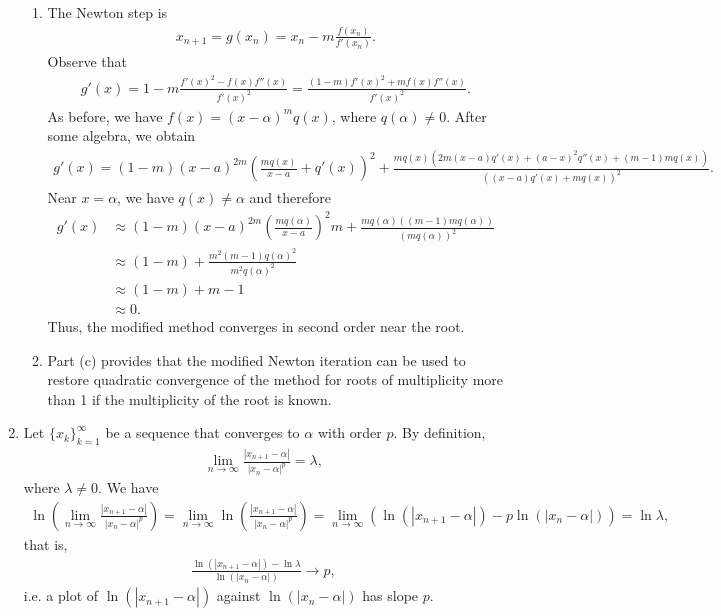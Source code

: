 \documentclass[10pt]{article}
\begin{document}
\begin{enumerate}
\begin{enumerate}
    \item The Newton step is \begin{align*}
        x_{n+1} = g(x_n) = x_n - m \frac{f(x_n)}{f'(x_n)}.
    \end{align*} Observe that \begin{align*}
        g'(x) = 1 - m\frac{f'(x)^2 - f(x)f''(x)}{f'(x)^2} = \frac{(1-m)f'(x)^2 + mf(x)f''(x)}{f'(x)^2}.
    \end{align*} As before, we have \(f(x) = (x-\alpha )^mq(x)\), where \(q(\alpha) \neq 0\). After some algebra, we obtain \begin{align*}
      g'(x) = (1-m) (x-a)^{2 m} \left(\frac{m q(x)}{x-a}+q'(x)\right)^2+\frac{m
      q(x) \left(2 m (x-a) q'(x)+(a-x)^2 q''(x)+(m-1) m
      q(x)\right)}{\left((x-a) q'(x)+m q(x)\right)^2}.
    \end{align*} Near \(x = \alpha \), we have \(q(x) \neq \alpha\) and therefore \begin{align*}
      g'(x) &\approx (1-m) (x-a)^{2 m} \left(\frac{m q(\alpha)}{x-a}\right)^2m + \frac{mq(\alpha) \left((m-1) mq(\alpha)\right)}{\left(m q(\alpha)\right)^2} \\
      &\approx (1-m) + \frac{m^2(m-1)q(\alpha)^2}{m^2q(\alpha)^2} \\
      &\approx (1-m) + m-1 \\
      &\approx 0.
    \end{align*} Thus, the modified method converges in second order near the root.

    \item Part (c) provides that the modified Newton iteration can be used to restore quadratic convergence of the method for roots of multiplicity more than 1 if the multiplicity of the root is known.
  \end{enumerate}

  \newpage

  \item Let \(\{x_k\}_{k=1}^\infty\) be a sequence that converges to \(\alpha\) with order \(p\). By definition, \begin{align*}
        \lim _{n \to \infty} \frac{|x_{n+1}-\alpha|}{|x_{n} - \alpha|^p} = \lambda,
    \end{align*} where \(\lambda \neq 0\). We have \begin{align*}
      \ln \left( \lim _{n \to \infty}  \frac{|x_{n+1}-\alpha|}{|x_{n} - \alpha|^p} \right) = \lim _{n \to \infty} \ln \left( \frac{|x_{n+1}-\alpha|}{|x_{n} - \alpha|^p} \right) = \lim _{n \to \infty} \left( \ln \left( |x_{n+1} - \alpha| \right) - p \ln  \left(| x_n - \alpha|  \right) \right) = \ln  \lambda,
    \end{align*} that is, \begin{align*}
      \frac{\ln \left( |x_{n+1} - \alpha| \right) - \ln \lambda }{\ln  \left(| x_n - \alpha|  \right)} \to p,
    \end{align*} i.e. a plot of \(\ln \left( |x_{n+1} - \alpha| \right)\) against \(\ln  \left(| x_n - \alpha|  \right)\) has slope \(p\).
  

\end{enumerate}
\end{document}
